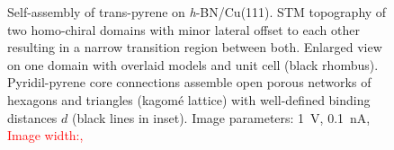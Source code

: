 \begin{figure}[] \centering
	\caption{Self-assembly of trans-pyrene on \textit{h}-BN/Cu(111).  STM topography of two homo-chiral domains with minor lateral offset to each other resulting in a narrow transition region between both.  Enlarged view on one domain with overlaid models and unit cell (black rhombus). Pyridil-pyrene core connections assemble open porous networks of hexagons and triangles (kagom\'e lattice) with well-defined binding distances $d$ (black lines in inset). Image parameters: \SI{1}{\volt}, \SI{0.1}{\nano \ampere}, \textcolor{red}{Image width:, }}
	\label{fig:pyrene-fig5}
\end{figure}

